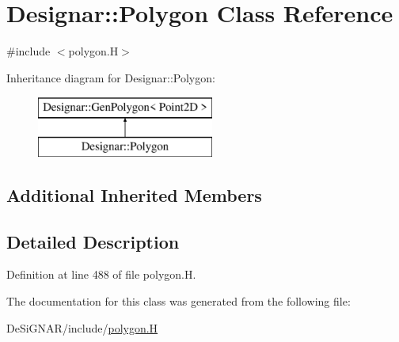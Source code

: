 \hypertarget{class_designar_1_1_polygon}{}\section{Designar\+:\+:Polygon Class Reference}
\label{class_designar_1_1_polygon}


{\ttfamily \#include $<$polygon.\+H$>$}

Inheritance diagram for Designar\+:\+:Polygon\+:\begin{figure}[H]
\begin{center}
\leavevmode
\includegraphics[height=2.000000cm]{class_designar_1_1_polygon}
\end{center}
\end{figure}
\subsection*{Additional Inherited Members}


\subsection{Detailed Description}


Definition at line 488 of file polygon.\+H.



The documentation for this class was generated from the following file\+:\begin{DoxyCompactItemize}
\item 
De\+Si\+G\+N\+A\+R/include/\hyperlink{polygon_8_h}{polygon.\+H}\end{DoxyCompactItemize}
